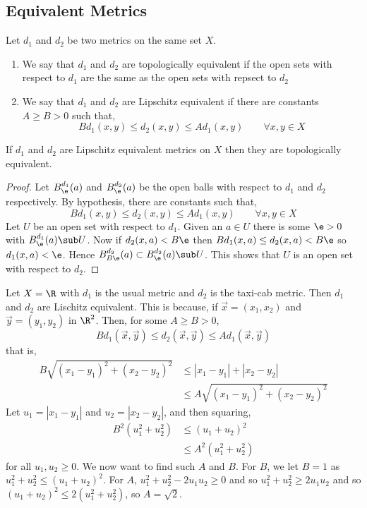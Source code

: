

\subsection{Equivalent Metrics}
\begin{ndefi}
  Let $d_1$ and $d_2$ be two metrics on the same set $X$.
  \begin{enumerate}
    \item We say that $d_1$ and $d_2$ are topologically equivalent if the open sets with respect to $d_1$ are the same as the open sets with repsect to $d_2$
    \item We say that $d_1$ and $d_2$ are Lipschitz equivalent if there are constants $A \ge B > 0$ such that,
    $$ Bd_1(x, y) \le d_2(x, y) \le Ad_1(x, y) \qquad \forall x, y \in X $$
  \end{enumerate}
\end{ndefi}

\begin{nprop}
   If $d_1$ and $d_2$ are Lipschitz equivalent metrics on $X$ then they are topologically equivalent.
\end{nprop}
\begin{proof}
  Let $B_\e^{d_1}(a)$ and $B_\e^{d_2}(a)$ be the open balls with respect to $d_1$ and $d_2$ respectively. By hypothesis, there are constants such that,
  $$ Bd_1(x, y) \le d_2(x, y) \le Ad_1(x, y) \qquad \forall x, y \in X $$
  Let $U$ be an open set with respect to $d_1$. Given an $a \in U$ there is some $\e > 0$ with $B_{\e}^{d_1}(a) \sub U$. Now if $d_2(x, a) < B\e$ then $Bd_1(x, a) \le d_2(x, a) < B\e$ so $d_1(x, a) < \e$. Hence $B_{B\e}^{d_2}(a) \subset B_{\e}^{d_2}(a) \sub U$. This shows that $U$ is an open set with respect to $d_2$.
\end{proof}

\begin{eg}
  Let $X = \R$ with $d_1$ is the usual metric and $d_2$ is the taxi-cab metric. Then $d_1$ and $d_2$ are Lischitz equivalent. This is because, if $\vec x = (x_1, x_2)$ and $\vec y = (y_1, y_2)$ in $\R^2$. Then, for some $A \ge B > 0$,
  $$ Bd_1(\vec x, \vec y) \le d_2(\vec x, \vec y) \le Ad_1(\vec x, \vec y) $$
  that is,
  \begin{align*}
    B\sqrt{(x_1 - y_1)^2 + (x_2 - y_2)^2} &\le |x_1 - y_1| + |x_2 - y_2|\\
    &\le A\sqrt{(x_1 - y_1)^2 + (x_2 - y_2)^2}
  \end{align*}
  Let $u_1 = |x_1 - y_1|$ and $u_2 = |x_2 - y_2|$, and then squaring,
  \begin{align*}
    B^2(u_1^2 + u_2^2) &\le (u_1 + u_2)^2 \\
    &\le A^2(u_1^2 + u_2^2)
  \end{align*}
  for all $u_1, u_2 \ge 0$. We now want to find such $A$ and $B$. For $B$, we let $B = 1$ as $u_1^2 + u_2^2 \le (u_1 + u_2)^2$. For $A$, $u_1^2 + u_2^2 - 2u_1u_2 \ge 0$ and so $u_1^2 + u_2^2 \ge 2u_1u_2$ and so $(u_1 + u_2)^2 \le 2(u_1^2 + u_2^2)$, so $A = \sqrt 2$.
\end{eg}

